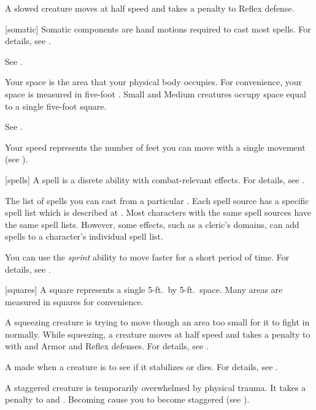  A slowed creature moves at half speed and takes a  penalty to Reflex defense.

[somatic] Somatic components are hand motions required to cast most spells.
For details, see .

 See .

 Your space is the area that your physical body occupies.
For convenience, your space is measured in five-foot .
Small and Medium creatures occupy space equal to a single five-foot square.

 See .

 Your speed represents the number of feet you can move with a single movement (see ).

[spells] A spell is a disrete  ability with combat-relevant effects.
For details, see .

 The list of spells you can cast from a particular .
Each spell source has a specific spell list which is described at .
Most characters with the same spell sources have the same spell lists.
However, some effects, such as a cleric's domains, can add spells to a character's individual spell list.

 You can use the \textit{sprint} ability to move faster for a short period of time.
For details, see .

[squares] A square represents a single 5-ft.\ by 5-ft.\ space.
Many areas are measured in squares for convenience.

 A squeezing creature is trying to move though an area too small for it to fight in normally.
While squeezing, a creature moves at half speed and takes a  penalty to  with  and Armor and Reflex defenses.
For details, see .

 A  made when a creature is  to see if it stabilizes or dies.
For details, see .

 A staggered creature is temporarily overwhelmed by physical trauma.
It takes a  penalty to  and .
Becoming  cause you to become staggered (see ).

